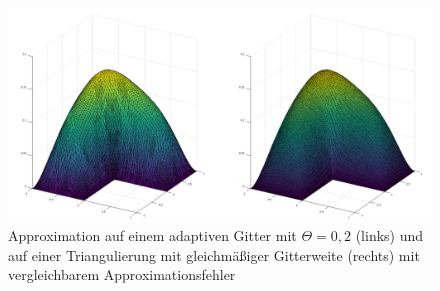 \begin{figure}[!htbp]
	\begin{center}
		\includegraphics[width=17cm]{pics/approx.PNG}
	\end{center}
	\caption{\label{app} Approximation auf einem adaptiven Gitter mit $\Theta = 0,2$ (links) und auf einer Triangulierung mit gleichmäßiger Gitterweite (rechts) mit vergleichbarem Approximationsfehler}
\end{figure}

